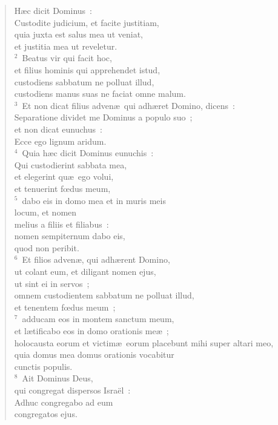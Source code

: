 \begin{flushleft}\begin{verse}\vspace{-19pt}\hspace{6pt}H\ae c dicit Dominus~:\\\hspace{6pt} Custodite judicium, et facite justitiam,\\ quia juxta est salus mea ut veniat,\\ et justitia mea ut reveletur.\\
${}^{2}$~Beatus vir qui facit hoc,\\ et filius hominis qui apprehendet istud,\\ custodiens sabbatum ne polluat illud,\\ custodiens manus suas ne faciat omne malum.\\
${}^{3}$~Et non dicat filius adven\ae\ qui adh\ae ret Domino, dicens~:\\ Separatione dividet me Dominus a populo suo~;\\ et non dicat eunuchus~:\\ Ecce ego lignum aridum.\\
${}^{4}$~Quia h\ae c dicit Dominus eunuchis~:\\ Qui custodierint sabbata mea,\\ et elegerint qu\ae\ ego volui,\\ et tenuerint fœdus meum,\\
${}^{5}$~dabo eis in domo mea et in muris meis\\ locum, et nomen\\ melius a filiis et filiabus~:\\ nomen sempiternum dabo eis,\\ quod non peribit.\\
${}^{6}$~Et filios adven\ae , qui adh\ae rent Domino,\\ ut colant eum, et diligant nomen ejus,\\ ut sint ei in servos~;\\ omnem custodientem sabbatum ne polluat illud,\\ et tenentem fœdus meum~;\\
${}^{7}$~adducam eos in montem sanctum meum,\\ et l\ae tificabo eos in domo orationis me\ae~;\\ holocausta eorum et victim\ae\ eorum placebunt mihi super altari meo,\\ quia domus mea domus orationis vocabitur\\ cunctis populis.\\
${}^{8}$~Ait Dominus Deus,\\ qui congregat dispersos Isra\"el~:\\ Adhuc congregabo ad eum\\ congregatos ejus.\end{verse}\end{flushleft}


